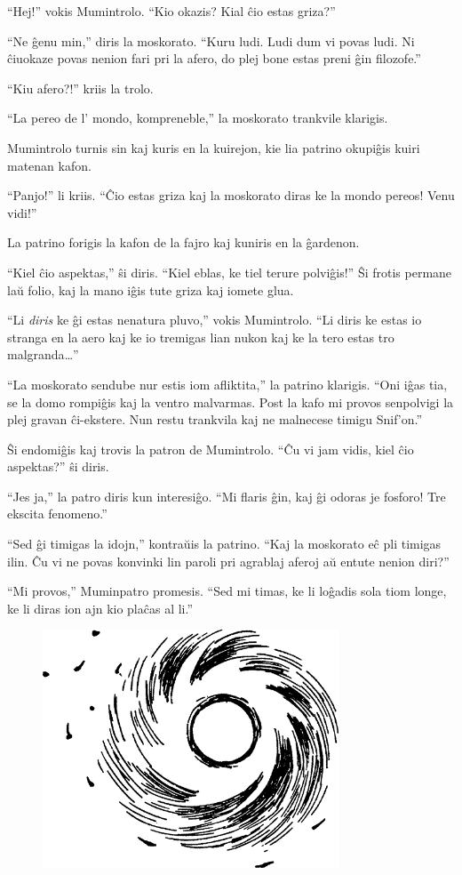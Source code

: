 ``Hej!'' vokis Mumintrolo. ``Kio okazis? Kial ĉio estas griza?''

``Ne ĝenu min,'' diris la moskorato. ``Kuru ludi. Ludi dum vi povas ludi. Ni ĉiuokaze povas nenion fari pri la afero, do plej bone estas preni ĝin filozofe.''

``Kiu afero?!'' kriis la trolo.

``La pereo de l' mondo, kompreneble,'' la moskorato trankvile klarigis.

Mumintrolo turnis sin kaj kuris en la kuirejon, kie lia patrino okupiĝis kuiri matenan kafon.

``Panjo!'' li kriis. ``Ĉio estas griza kaj la moskorato diras ke la mondo pereos! Venu vidi!''

La patrino forigis la kafon de la fajro kaj kuniris en la ĝardenon.

``Kiel ĉio aspektas,'' ŝi diris. ``Kiel eblas, ke tiel terure polviĝis!'' Ŝi frotis permane laŭ folio, kaj la mano iĝis tute griza kaj iomete glua.

``Li \emph{diris} ke ĝi estas nenatura pluvo,'' vokis Mumintrolo. ``Li diris ke estas io stranga en la aero kaj ke io tremigas lian nukon kaj ke la tero estas tro malgranda{\ldots}''

``La moskorato sendube nur estis iom afliktita,'' la patrino klarigis. ``Oni iĝas tia, se la domo rompiĝis kaj la ventro malvarmas. Post la kafo mi provos senpolvigi la plej gravan ĉi-ekstere. Nun restu trankvila kaj ne malnecese timigu Snif'on.''

Ŝi endomiĝis kaj trovis la patron de Mumintrolo. ``Ĉu vi jam vidis, kiel ĉio aspektas?'' ŝi diris.

``Jes ja,'' la patro diris kun interesiĝo. ``Mi flaris ĝin, kaj ĝi odoras je fosforo! Tre ekscita fenomeno.''

``Sed ĝi timigas la idojn,'' kontraŭis la patrino. ``Kaj la moskorato eĉ pli timigas ilin. Ĉu vi ne povas konvinki lin paroli pri agrablaj aferoj aŭ entute nenion diri?''

``Mi provos,'' Muminpatro promesis. ``Sed mi timas, ke li loĝadis sola tiom longe, ke li diras ion ajn kio plaĉas al li.''

\begin{figure}[htbp]
\centering
\includegraphics[width=250pt,height=201pt]{2-2.png}
\caption{}
\label{2-2}
\end{figure}

